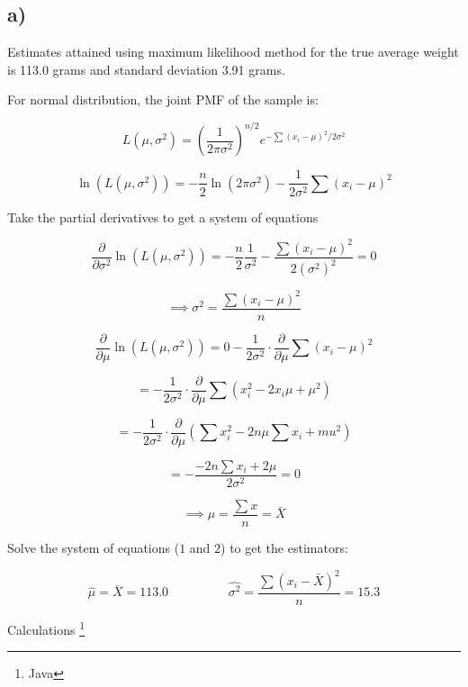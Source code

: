 \documentclass[a4paper,11pt]{article}
\begin{document}
\subsection*{a)}

Estimates attained using maximum likelihood method for the true average weight is 113.0 
grams and standard deviation 3.91 grams.\newline

For normal distribution, the joint PMF of the sample is:

\[ L(\mu, \sigma^2) = \left(\frac{1}{2\pi\sigma^2}\right)^{n/2} e^{-\sum(x_i - \mu)^2/2\sigma^2} \]

\[ \ln(L(\mu, \sigma^2)) = -\frac{n}{2}\ln(2\pi\sigma^2) - \frac{1}{2\sigma^2}\sum{(x_i-\mu)^2} \]


Take the partial derivatives to get a system of equations

\[ \frac{\partial}{\partial \sigma^2} \ln(L(\mu, \sigma^2)) = -\frac{n}{2}\frac{1}{\sigma^2} - \frac{\sum{(x_i-\mu)^2}}{2(\sigma^2)^2} = 0\] 

\begin{equation}
\implies \sigma^2 = \frac{\sum{(x_i-\mu)^2}}{n}
\end{equation}


\[ \frac{\partial}{\partial \mu} \ln(L(\mu, \sigma^2)) = 0 - \frac{1}{2\sigma^2} \cdot \frac{\partial}{\partial \mu} \sum{(x_i-\mu)^2} \]

\[ = - \frac{1}{2\sigma^2} \cdot \frac{\partial}{\partial \mu}\sum{(x_i^2 -2x_i\mu + \mu^2)} \]

\[ = - \frac{1}{2\sigma^2} \cdot \frac{\partial}{\partial \mu} \left(\sum{x_i^2} - 2n\mu\sum{x_i} + mu^2\right)\]

\[ = - \frac{-2n\sum{x_i} + 2\mu}{2\sigma^2} = 0 \]

\begin{equation}
\implies \mu = \frac{\sum{x}}{n} = \bar{X} 
\end{equation}

\vspace{5mm}
Solve the system of equations ($1$ and $2$) to get the estimators:

\[ \hat{\mu} = \bar{X} =113.0 \hspace{2cm} \hat{\sigma^2} = \frac{\sum{(x_i-\bar{X})^2}}{n} = 15.3 \]

\clearpage

Calculations \footnote{Java}
\end{document}
